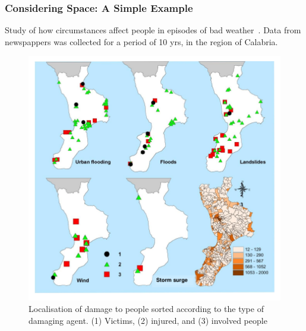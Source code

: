 \documentclass[hyperref={pdfpagelabels=true}]{beamer}
\begin{document}
\begin{frame}
\frametitle{Considering Space: A Simple Example}
Study of how circumstances affect people in episodes of bad weather~\cite{calabria}. Data from newspappers was collected for a period of 10 yrs, in the region of Calabria.
\begin{figure}
\includegraphics[scale=0.55]{damage_agent.png}
\caption{\tiny{Localisation of damage to people sorted according to the type of damaging agent. (1) Victims, (2) injured, and (3) involved people~\cite{calabria}}}
\end{figure}
\end{frame}
\end{document}
